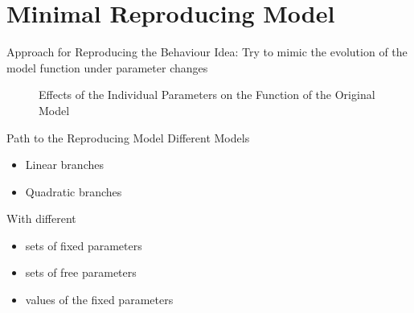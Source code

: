 
\section{Minimal Reproducing Model}

\begin{frame}{Approach for Reproducing the Behaviour}
    Idea:
    Try to mimic the evolution of the model function under parameter changes

    \vspace{-2.0em}
    \begin{figure}
        \centering
        \caption{Effects of the Individual Parameters on the Function of the Original Model}
    \end{figure}
\end{frame}

\begin{frame}{Path to the Reproducing Model}
    Different Models
    \begin{itemize}
        \item Linear branches
        \item Quadratic branches
    \end{itemize}

    \vspace{2em}
    With different
    \begin{itemize}
        \item sets of fixed parameters
        \item sets of free parameters
        \item values of the fixed parameters
    \end{itemize}
\end{frame}

